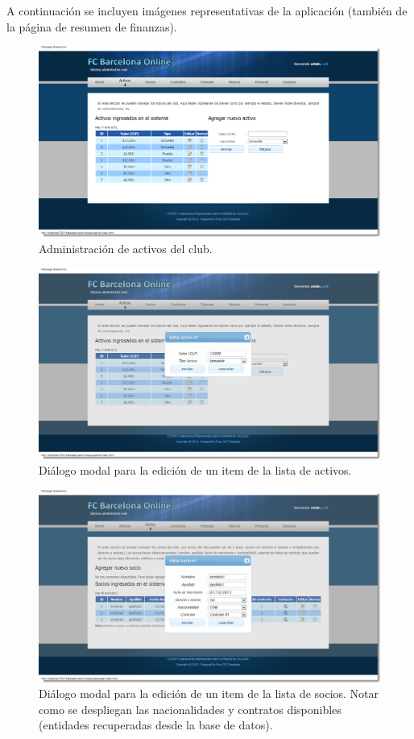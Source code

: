 \documentclass[letter]{article}
\begin{document}
A continuación se incluyen imágenes representativas de la aplicación (también de la página de resumen de finanzas).

\begin{figure}
\centering
  \includegraphics[width=\textwidth]{figs/fig2.png}
  \caption{Administración de activos del club.}
\end{figure}

\begin{figure}
\centering
  \includegraphics[width=\textwidth]{figs/fig3.png}
  \caption{Diálogo modal para la edición de un item de la lista de activos.}
\end{figure}

\begin{figure}
\centering
  \includegraphics[width=\textwidth]{figs/fig4.png}
  \caption{Diálogo modal para la edición de un item de la lista de socios. Notar como se despliegan las nacionalidades y contratos disponibles (entidades recuperadas desde la base de datos).}
\end{figure}
\end{document}
